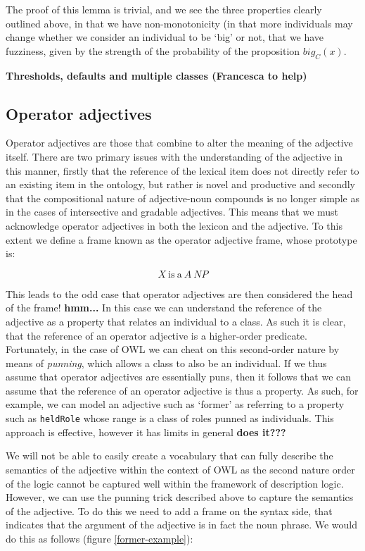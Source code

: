 \documentclass[11pt]{article}
\begin{document}
The proof of this lemma is trivial, and we see the three properties clearly 
outlined above, in that we have non-monotonicity (in that more individuals may
 change whether we consider an individual to be `big' or not, that we have 
fuzziness, given by the strength of the probability of the proposition 
$big_C(x)$.

\textbf{Thresholds, defaults and multiple classes (Francesca to help)}

\subsection{Operator adjectives}

Operator adjectives are those that combine to alter the meaning of the adjective 
itself. There are two primary issues with the understanding of the adjective in 
this manner, firstly that the reference of the lexical item does not directly 
refer to an existing item in the ontology, but rather is novel and productive 
and secondly that the compositional nature of adjective-noun compounds is no 
longer simple as in the cases of intersective and gradable adjectives. This 
means that we must acknowledge operator adjectives in both the lexicon and the 
adjective. To this extent we define a frame known as the operator adjective 
frame, whose prototype is:

$$X\mathrm{~is~a~}A~NP$$

This leads to the odd case that operator adjectives are then considered the 
head of the frame! \textbf{hmm...} In this case 
we can understand the reference of the adjective as a property that relates an 
individual to a class. As such it is clear, that the reference of an operator 
adjective is a higher-order predicate. Fortunately, in the case of OWL we can 
cheat on this second-order nature by means of \emph{punning}, which allows a 
class to also be an individual. If we thus assume that operator adjectives are 
essentially puns, then it follows that we can assume that the reference of an 
operator adjective is thus a property. As such, for example, we can model an 
adjective such as `former' as referring to a property such as {\tt heldRole} 
whose range is a class of roles punned as individuals. This approach is 
effective, however it has limits in general \textbf{does it???}

We will not be able to easily create a vocabulary that can fully describe the 
semantics of the adjective within the context of OWL as the second nature order 
of the logic cannot be captured well within the framework of description logic. 
However, we can use the punning trick described above to capture the semantics
of the adjective. To do this we need to add a frame on the syntax side, that 
indicates that the argument of the adjective is in fact the noun phrase. We 
would do this as follows (figure \ref{former-example}):
\end{document}
